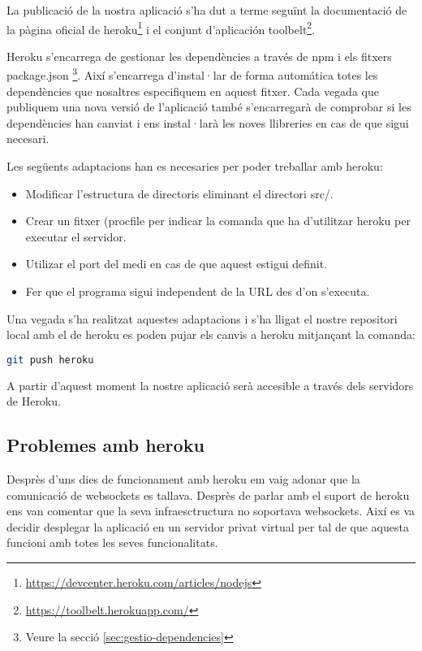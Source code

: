 La publicació de la nostra aplicació s'ha dut a terme seguïnt la documentació de la pàgina oficial de heroku\footnote{\url{https://devcenter.heroku.com/articles/nodejs}} i el conjunt d'aplicación toolbelt\footnote{\url{https://toolbelt.herokuapp.com/}}. 

Heroku s'encarrega de gestionar les dependències a través de npm i els fitxers package.json \footnote{Veure la secció \ref{sec:gestio-dependencies}}. Així s'encarrega d'instal·lar de forma automática totes les dependències que nosaltres especifiquem en aquest fitxer. Cada vegada que publiquem una nova versió de l'aplicació també s'encarregarà de comprobar si les dependències han canviat i ens instal·larà les noves llibreries en cas de que sigui necesari. 

Les següents adaptacions han es necesaries per poder treballar amb heroku: 

\begin{itemize}
\item{Modificar l'estructura de directoris eliminant el directori src/.}
\item{Crear un fitxer (procfile per indicar la comanda que ha d'utilitzar heroku per executar el servidor.}
\item{Utilizar el port del medi en cas de que aquest estigui definit. }
\item{Fer que el programa sigui independent de la URL des d'on s'executa.}
\end{itemize}

Una vegada s'ha realitzat aquestes adaptacions i s'ha lligat el nostre repositori local amb el de heroku es poden pujar els canvis a heroku mitjançant la comanda: 

\begin{lstlisting}[language=bash]
git push heroku
\end{lstlisting}

A partir d'aquest moment la nostre aplicació serà accesible a través dels servidors de Heroku.

\subsection{Problemes amb heroku}

Desprès d'uns dies de funcionament amb heroku em vaig adonar que la comunicació de websockets es tallava. Desprès de parlar amb el suport de heroku ens van comentar que la seva infraesctructura no soportava websockets. Així es va decidir desplegar la aplicació en un servidor privat virtual per tal de que aquesta funcioni amb totes les seves funcionalitats. 

